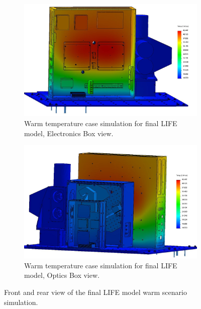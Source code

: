 \begin{figure}
    \centering
    \begin{subfigure}[h]{0.9\textwidth}
        \centering
        \includegraphics[width=\textwidth]{chap3_images/LIFE_V5_initial_images/Iteration_3_ebox_no_labels.JPG}
        \caption{Warm temperature case simulation for final LIFE model, Electronics Box view.}
        \label{fig:LIFE_V5_FINAL_TA_WARM_EBOX}
    \end{subfigure}
    \begin{subfigure}[h]{0.9\textwidth}
        \centering
        \includegraphics[width=\textwidth]{chap3_images/LIFE_V5_initial_images/Iteration_3_no_labels.JPG}
        \caption{Warm temperature case simulation for final LIFE model, Optics Box view.}
        \label{fig:LIFE_V5_FINAL_TA_WARM_OBOX}
    \end{subfigure}
    \caption{Front and rear view of the final LIFE model warm scenario simulation.}
    \label{LIFE_V5_FINAL_TA_WARM}
\end{figure}

